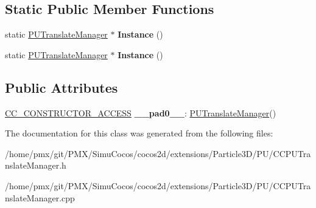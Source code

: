 \subsection*{Static Public Member Functions}
\begin{DoxyCompactItemize}
\item 
\mbox{\label{classPUTranslateManager_a0aaca799f9b7d55bccf85c3b2373ef48}} 
static \hyperlink{classPUTranslateManager}{P\+U\+Translate\+Manager} $\ast$ {\bfseries Instance} ()
\item 
\mbox{\label{classPUTranslateManager_a39343fb3d53f780e21848c291fcdbbd5}} 
static \hyperlink{classPUTranslateManager}{P\+U\+Translate\+Manager} $\ast$ {\bfseries Instance} ()
\end{DoxyCompactItemize}
\subsection*{Public Attributes}
\begin{DoxyCompactItemize}
\item 
\mbox{\label{classPUTranslateManager_a0d0b9cc4a0980f19d19501e8331eb876}} 
\hyperlink{_2cocos2d_2cocos_2base_2ccConfig_8h_a25ef1314f97c35a2ed3d029b0ead6da0}{C\+C\+\_\+\+C\+O\+N\+S\+T\+R\+U\+C\+T\+O\+R\+\_\+\+A\+C\+C\+E\+SS} {\bfseries \+\_\+\+\_\+pad0\+\_\+\+\_\+}\+: \hyperlink{classPUTranslateManager}{P\+U\+Translate\+Manager}()
\end{DoxyCompactItemize}


The documentation for this class was generated from the following files\+:\begin{DoxyCompactItemize}
\item 
/home/pmx/git/\+P\+M\+X/\+Simu\+Cocos/cocos2d/extensions/\+Particle3\+D/\+P\+U/C\+C\+P\+U\+Translate\+Manager.\+h\item 
/home/pmx/git/\+P\+M\+X/\+Simu\+Cocos/cocos2d/extensions/\+Particle3\+D/\+P\+U/C\+C\+P\+U\+Translate\+Manager.\+cpp\end{DoxyCompactItemize}
